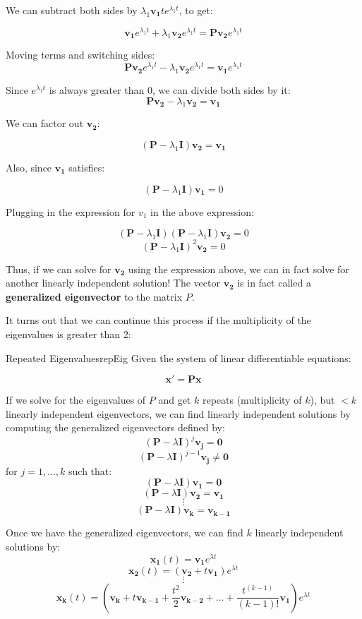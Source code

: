 \documentclass{report}
\begin{document}
We can subtract both sides by  $\lambda_1\mathbf{v_1}te^{\lambda_1 t}$, to get:

$$\mathbf{v_1}e^{\lambda_1 t} + \lambda_1\mathbf{v_2}e^{\lambda_1 t} = \mathbf{P}\mathbf{v_2}e^{\lambda_1 t}$$

Moving terms and switching sides:
$$\mathbf{P}\mathbf{v_2}e^{\lambda_1 t} - \lambda_1\mathbf{v_2}e^{\lambda_1 t} = \mathbf{v_1}e^{\lambda_1 t}  $$

Since $e^{\lambda_1 t}$ is always greater than 0, we can divide both sides by it:
$$\mathbf{P}\mathbf{v_2} - \lambda_1\mathbf{v_2} = \mathbf{v_1} $$

We can factor out $\mathbf{v_2}$:

$$(\mathbf{P}-\lambda_1\mathbf{I})\mathbf{v_2} = \mathbf{v_1} $$

Also, since $\mathbf{v_1}$ satisfies:

$$(\mathbf{P}-\lambda_1\mathbf{I})\mathbf{v_1} = 0$$

Plugging in the expression for $v_1$ in the above expression:

$$(\mathbf{P}-\lambda_1\mathbf{I})(\mathbf{P}-\lambda_1\mathbf{I})\mathbf{v_2} = 0$$
$$(\mathbf{P}-\lambda_1\mathbf{I})^2\mathbf{v_2} = 0$$


Thus, if we can solve for $\mathbf{v_2}$ using the expression above, we can in fact solve for another linearly independent solution! The vector $\mathbf{v_2}$ is in fact called a \textbf{generalized eigenvector} to the matrix $P$.


It turns out that we can continue this process if the multiplicity of the eigenvalues is greater than 2:

\begin{mytheo}{Repeated Eigenvalues}{repEig}
    Given the system of linear differentiable equations:
    
    $$\mathbf{x'} = \mathbf{Px}$$
    
    If we solve for the eigenvalues of $P$ and get $k$ repeats (multiplicity of $k$), but $< k$ linearly independent eigenvectors, we can find linearly independent solutions by computing the generalized eigenvectors defined by:
    $$(\mathbf{P}-\lambda\mathbf{I})^j\mathbf{v_j} = \mathbf{0} $$
    $$(\mathbf{P}-\lambda\mathbf{I})^{j-1}\mathbf{v_j} \neq \mathbf{0}$$
    for $j = 1, \dots, k$
    such that:
    $$(\mathbf{P}-\lambda\mathbf{I})\mathbf{v_1} = \mathbf{0}$$
    $$(\mathbf{P}-\lambda\mathbf{I})\mathbf{v_2} = \mathbf{v_1}$$
    $$\vdots$$
    $$(\mathbf{P}-\lambda\mathbf{I})\mathbf{v_k} = \mathbf{v_{k-1}}$$
    
    Once we have the generalized eigenvectors, we can find $k$ linearly independent solutions by:
    $$\mathbf{x_1}(t) = \mathbf{v_1}e^{\lambda t}$$
    $$\mathbf{x_2}(t) = (\mathbf{v_2} + t\mathbf{v_1})e^{\lambda t}$$
    $$\vdots$$
    $$\mathbf{x_k}(t) = \left(\mathbf{v_k} + t\mathbf{v_{k-1}} + \frac{t^2}{2}\mathbf{v_{k-2}} + \dots + \frac{t^{(k-1)}}{(k-1)!}\mathbf{v_1}\right)e^{\lambda t}$$
\end{mytheo}
\end{document}
